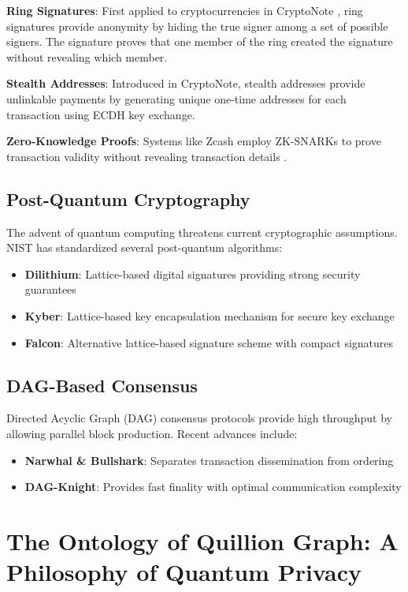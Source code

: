 \documentclass[12pt,a4paper]{article}
\begin{document}
\textbf{Ring Signatures}: First applied to cryptocurrencies in CryptoNote \cite{cryptonote}, ring signatures provide anonymity by hiding the true signer among a set of possible signers. The signature proves that one member of the ring created the signature without revealing which member.

\textbf{Stealth Addresses}: Introduced in CryptoNote, stealth addresses provide unlinkable payments by generating unique one-time addresses for each transaction using ECDH key exchange.

\textbf{Zero-Knowledge Proofs}: Systems like Zcash employ ZK-SNARKs to prove transaction validity without revealing transaction details \cite{zcash}.

\subsection{Post-Quantum Cryptography}

The advent of quantum computing threatens current cryptographic assumptions. NIST has standardized several post-quantum algorithms:

\begin{itemize}
\item \textbf{Dilithium}: Lattice-based digital signatures providing strong security guarantees
\item \textbf{Kyber}: Lattice-based key encapsulation mechanism for secure key exchange
\item \textbf{Falcon}: Alternative lattice-based signature scheme with compact signatures
\end{itemize}

\subsection{DAG-Based Consensus}

Directed Acyclic Graph (DAG) consensus protocols provide high throughput by allowing parallel block production. Recent advances include:

\begin{itemize}
\item \textbf{Narwhal \& Bullshark}: Separates transaction dissemination from ordering
\item \textbf{DAG-Knight}: Provides fast finality with optimal communication complexity
\end{itemize}

\section{The Ontology of Quillion Graph: A Philosophy of Quantum Privacy}
\end{document}
